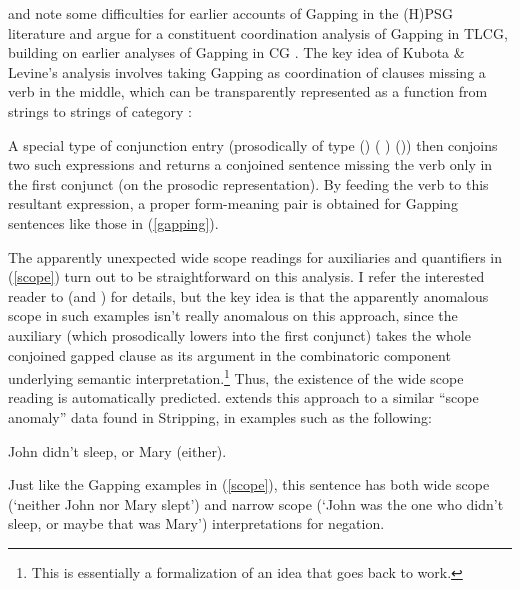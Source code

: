 \documentclass[output=paper
                ,modfonts
 	        ,biblatex
                ,babelshorthands
                ,newtxmath
                ,draftmode
                ,colorlinks, citecolor=brown
]{langscibook}
\begin{document}
\citet{kubota-levine-gapping} and 
\citet[Section~3.1]{KubotaLevineBook} note some
difficulties for earlier accounts of Gapping in the (H)PSG literature
\citep{sgww,abeille-ea} and argue for a constituent coordination
analysis of Gapping in TLCG, building on earlier analyses of Gapping
in CG \citep{Steedman90a-u,hendriks95,morrillsolias93}. The key idea
of Kubota \& Levine's analysis involves taking Gapping as coordination of clauses
missing a verb in the middle, which can be transparently represented
as a function from strings to strings of category {}:

\begin{exe}
 \ex
  \LexEnt{\pt{\ensuremath{\lambda} \ensuremath{\greekp}. leslie \ensuremath{\circ}\xspace \ensuremath{\greekp} \ensuremath{\circ}\xspace a \ensuremath{\circ}\xspace cd }}{\sem{ \lambda R. \exists x. \trns{cd}(x) \ensuremath{ \wedge\xspace } R(x)(\trns{l}) }}{\syncat{S\vs ((NP\ensuremath{\backslash}{}S)/NP)}}
\end{exe}
A special type of conjunction entry (prosodically of type
(\yusukest\xspace \shortarrow \yusukest\xspace) \shortarrow (\yusukest\xspace
\shortarrow \yusukest\xspace) \shortarrow (\yusukest\xspace \shortarrow \yusukest\xspace))
then conjoins two such expressions
and returns a conjoined sentence missing the verb only in the first
conjunct (on the prosodic representation). By feeding the verb to
this resultant expression,  a proper form-meaning  pair is obtained
for Gapping sentences like those in (\ref{gapping}).

The apparently unexpected wide scope readings for auxiliaries and
quantifiers in (\ref{scope}) turn out to be straightforward on this
analysis. I refer the interested reader to
\citet{kubota-levine-gapping} (and \citet[Chapter 3]{KubotaLevineBook}) for
details, but the key idea is that the apparently anomalous scope in
such examples isn't really anomalous on this approach, since the
auxiliary (which prosodically lowers into the first conjunct) takes
the whole conjoined gapped clause as its argument in the combinatoric
component underlying semantic interpretation.\footnote{This is
  essentially a formalization of an idea that goes back to
   work.} Thus, the existence
of the wide scope reading is automatically predicted.
\citet{puthawala2018} extends this approach to a similar ``scope anomaly''
data found in Stripping, in examples such as the following:

\begin{exe}
 \ex   John didn't sleep, or Mary (either).
\end{exe}
Just like the Gapping examples in (\ref{scope}), this sentence has
both wide scope (`neither John nor Mary slept') and narrow scope
(`John was the one who didn't sleep, or maybe that was Mary')
interpretations for negation.
\end{document}

